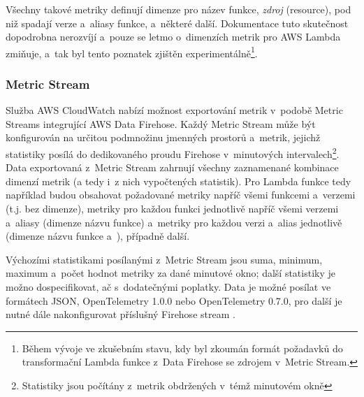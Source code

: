 \documentclass[czech, ing, kiv, he, iso690]{fasthesis}
\begin{document}
Všechny takové metriky definují dimenze pro název funkce, \emph{zdroj} (resource), pod niž spadají verze a~aliasy funkce, a~některé další. Dokumentace tuto skutečnost dopodrobna nerozvíjí a~pouze se letmo o~dimenzích metrik pro AWS Lambda zmiňuje, a~tak byl tento poznatek zjištěn experimentálně\footnote{Během vývoje ve zkušebním stavu, kdy byl zkoumán formát požadavků do transformační Lambda funkce z~Data Firehose se zdrojem v~Metric Stream.}. 


\subsubsection{Metric Stream}
\label{sec:analysis_metric_stream}
Služba AWS CloudWatch nabízí možnost exportování metrik v~podobě Metric Streams integrující AWS Data Firehose. Každý Metric Stream může být konfigurován na určitou podmnožinu jmenných prostorů a~metrik, jejichž statistiky posílá do dedikovaného proudu Firehose v~minutových intervalech\footnote{Statistiky jsou počítány z~metrik obdržených v~témž minutovém okně}. Data exportovaná z~Metric Stream zahrnují všechny zaznamenané kombinace dimenzí metrik (a tedy i~z nich vypočtených statistik). Pro Lambda funkce tedy například budou obsahovat požadované metriky napříč všemi funkcemi a~verzemi (t.j. bez dimenze), metriky pro každou funkci jednotlivě napříč všemi verzemi a~aliasy (dimenze názvu funkce) a~metriky pro každou verzi a~alias jednotlivě (dimenze názvu funkce a~), případně další. 

Výchozími statistikami posílanými z~Metric Stream jsou suma, minimum, maximum a~počet hodnot metriky za dané minutové okno; další statistiky je možno dospecifikovat, ač s~dodatečnými poplatky. Data je možné posílat ve formátech JSON, OpenTelemetry 1.0.0 nebo OpenTelemetry 0.7.0, pro další je nutné dále nakonfigurovat příslušný Firehose stream \cite{cloudwatch.docs.aws}.
\end{document}
